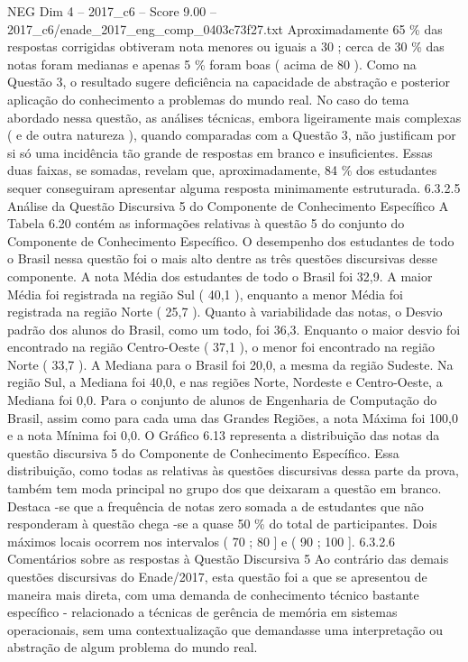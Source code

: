 \begin{textsample}{NEG Dim 4 – 2017\_c6 – Score 9.00 – 2017\_c6/enade\_2017\_eng\_comp\_0403c73f27.txt}
Aproximadamente 65 \% das respostas corrigidas obtiveram nota menores ou iguais a 30 ; cerca de 30 \% das notas foram medianas e apenas 5 \% foram boas ( acima de 80 ).
Como na Questão 3, o resultado sugere deficiência na capacidade de abstração e posterior aplicação do conhecimento a problemas do mundo real.
No caso do tema abordado nessa questão, as análises técnicas, embora ligeiramente mais complexas ( e de outra natureza ), quando comparadas com a Questão 3, não justificam por si só uma incidência tão grande de respostas em branco e insuficientes.
Essas duas faixas, se somadas, revelam que, aproximadamente, 84 \% dos estudantes sequer conseguiram apresentar alguma resposta minimamente estruturada. 6.3.2.5 Análise da Questão Discursiva 5 do Componente de Conhecimento Específico A Tabela 6.20 contém as informações relativas à questão 5 do conjunto do Componente de Conhecimento Específico.
O desempenho dos estudantes de todo o Brasil nessa questão foi o mais alto dentre as três questões discursivas desse componente.
A nota Média dos estudantes de todo o Brasil foi 32,9.
A maior Média foi registrada na região Sul ( 40,1 ), enquanto a menor Média foi registrada na região Norte ( 25,7 ).
Quanto à variabilidade das notas, o Desvio padrão dos alunos do Brasil, como um todo, foi 36,3.
Enquanto o maior desvio foi encontrado na região Centro-Oeste ( 37,1 ), o menor foi encontrado na região Norte ( 33,7 ).
A Mediana para o Brasil foi 20,0, a mesma da região Sudeste.
Na região Sul, a Mediana foi 40,0, e nas regiões Norte, Nordeste e Centro-Oeste, a Mediana foi 0,0.
Para o conjunto de alunos de Engenharia de Computação do Brasil, assim como para cada uma das Grandes Regiões, a nota Máxima foi 100,0 e a nota Mínima foi 0,0.
O Gráfico 6.13 representa a distribuição das notas da questão discursiva 5 do Componente de Conhecimento Específico.
Essa distribuição, como todas as relativas às questões discursivas dessa parte da prova, também tem moda principal no grupo dos que deixaram a questão em branco.
Destaca -se que a frequência de notas zero somada a de estudantes que não responderam à questão chega -se a quase 50 \% do total de participantes.
Dois máximos locais ocorrem nos intervalos ( 70 ; 80 ] e ( 90 ; 100 ]. 6.3.2.6 Comentários sobre as respostas à Questão Discursiva 5 Ao contrário das demais questões discursivas do Enade/2017, esta questão foi a que se apresentou de maneira mais direta, com uma demanda de conhecimento técnico bastante específico - relacionado a técnicas de gerência de memória em sistemas operacionais, sem uma contextualização que demandasse uma interpretação ou abstração de algum problema do mundo real.

\end{textsample}
